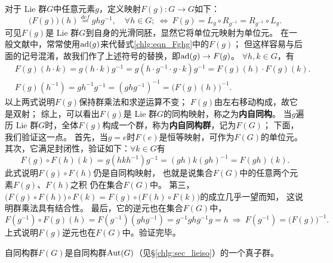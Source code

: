 对于 Lie 群$G$中任意元素$g$，定义映射$F(g):G\to G$如下：
\begin{equation}\label{chlg:eqn_Fghg}
    \bigl(F(g)\bigr) (h) \overset{def}{=} g h g^{-1},\quad \forall h\in G;
    \ \Leftrightarrow \
    F(g) = L_g \circ R_{g^{-1}} = R_{g^{-1}}\circ L_g .
\end{equation}
可见$F(g)$是 Lie 群$G$到自身的光滑同胚，显然它将单位元映射为单位元。
在一般文献中，常常使用${\rm ad}(g)$来代替式\eqref{chlg:eqn_Fghg}中的$F(g)$；
但这样容易与后面的记号混淆，故我们作了上述符号的替换，即${\rm ad}(g) \to F(g)$。
$\forall h,k\in G$，有
\begin{align}
    &F(g) (h\cdot k) = g(h\cdot k)g^{-1}=g(h\cdot g^{-1} \cdot g\cdot k)g^{-1}
    =F(g) (h) \cdot F(g) (k) . \\
    &F(g)(h^{-1}) = gh^{-1}g^{-1} = (ghg^{-1})^{-1} = \bigl(F(g) (h)\bigr)^{-1} .
\end{align}
以上两式说明$F(g)$保持群乘法和求逆运算不变；
$F(g)$由左右移动构成，故它是双射；
综上，可以看出$F(g)$是 Lie 群$G$的同构映射，称之为\textbf{内自同构}。
当$g$遍历 Lie 群$G$时，全体$F(g)$构成一个群，称为\textbf{内自同构群}，记为$F(G)$；
下面，我们验证这一点。
首先，当$g=e$时$F(e)$是恒等映射，可作为$F(G)$的单位元。
其次，它满足封闭性，验证如下：$\forall k\in G$有
\begin{equation}\label{chlg:eqn_tmpffkk}
    F(g)\circ F(h) (k) = g(hkh^{-1})g^{-1}
    =(gh) k (gh)^{-1} = F(gh)(k) .
\end{equation}
此式说明$F(g)\circ F(h)$仍是自同构映射，
也就是说集合$F(G)$中的任意两个元素$F(g)$、$ F(h)$之积
仍在集合$F(G)$中。
第三，$\bigl(F(g)\circ F(h)\bigr)\circ F(k)
=F(g)\circ\bigl( F(h)\circ F(k)\bigr)$的成立几乎一望而知，
这说明群乘法具有结合性。
最后，它的逆元也在集合$F(G)$中，
\begin{equation*}
    F(g^{-1})\circ F(g) (h)=F(g^{-1})(g h g^{-1} ) = g^{-1} g h g^{-1} g = h
    \ \Rightarrow \  F(g^{-1}) = \bigl( F(g)\bigr)^{-1} .
\end{equation*}
上式说明$F(g)$逆元也在$F(G)$中。验证完毕。

自同构群$F(G)$是自同构群${\rm Aut}(G)$（见\S\ref{chlg:sec_lieiso}）的一个真子群。

